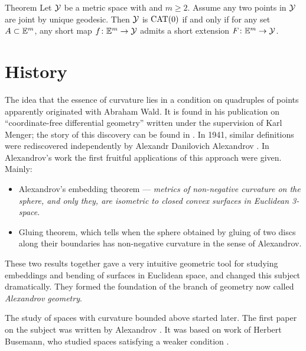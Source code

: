 \begin{thm}{Theorem}
Let $\mathcal{Y}$ be a metric space with and $m\ge 2$.
Assume any two points in $\mathcal{Y}$ are joint by unique geodesic.
Then $\mathcal{Y}$ is $\mathrm{CAT}(0)$ if and only if for any set $A\subset \mathbb{E}^m$, 
any short map $f\colon\mathbb{E}^m\to \mathcal{Y}$ 
admits a short extension $F\colon\mathbb{E}^m\to \mathcal{Y}$.
\end{thm} 


\section{History}

The idea that the essence of curvature lies in a condition on quadruples of points apparently originated with Abraham Wald.
It is found in his publication on ``coordinate-free differential geometry'' \cite{wald} written under the supervision of Karl Menger;
the story of this discovery can be found in \cite{menger}.
In 1941, similar definitions were rediscovered independently by 
Alexandr Danilovich Alexandrov %
\cite{alexandrov:def}.
In Alexandrov's work the first fruitful applications of this approach were given.
Mainly:
\begin{itemize}
\item Alexandrov's embedding theorem --- 
\textit{metrics of non-negative curvature on the sphere, and only they, are isometric to closed convex surfaces in Euclidean 3-space}. 
\item Gluing theorem, which tells  when the sphere obtained by gluing of two discs along their boundaries has non-negative curvature in the sense of Alexandrov.
\end{itemize}
These two results together gave  a very intuitive geometric tool for studying  embeddings and bending of surfaces in  Euclidean space, and changed this subject dramatically.
They formed the foundation of the branch of geometry now called \emph{Alexandrov geometry}.

The study of  spaces with curvature bounded above started later.
The first paper on the subject was written by Alexandrov \cite{alexandrov:strong-angle}.
It was based on work of Herbert Busemann, who studied spaces satisfying a weaker condition \cite{busemann-CBA}.
